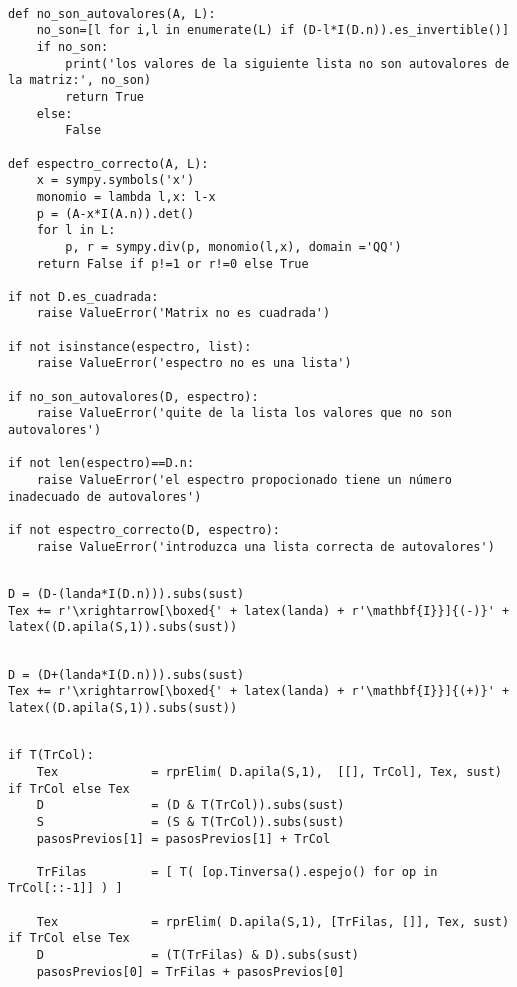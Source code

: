 \documentclass[11pt]{report}
\begin{document}
\begin{verbatim}

def no_son_autovalores(A, L):
    no_son=[l for i,l in enumerate(L) if (D-l*I(D.n)).es_invertible()]
    if no_son:
        print('los valores de la siguiente lista no son autovalores de la matriz:', no_son)
        return True
    else:
        False

def espectro_correcto(A, L):
    x = sympy.symbols('x')    
    monomio = lambda l,x: l-x
    p = (A-x*I(A.n)).det()
    for l in L:
        p, r = sympy.div(p, monomio(l,x), domain ='QQ')    
    return False if p!=1 or r!=0 else True

if not D.es_cuadrada:
    raise ValueError('Matrix no es cuadrada')

if not isinstance(espectro, list):
    raise ValueError('espectro no es una lista')

if no_son_autovalores(D, espectro):
    raise ValueError('quite de la lista los valores que no son autovalores')
    
if not len(espectro)==D.n:
    raise ValueError('el espectro propocionado tiene un número inadecuado de autovalores')

if not espectro_correcto(D, espectro):
    raise ValueError('introduzca una lista correcta de autovalores')

\end{verbatim}


\begin{verbatim}

D = (D-(landa*I(D.n))).subs(sust)
Tex += r'\xrightarrow[\boxed{' + latex(landa) + r'\mathbf{I}}]{(-)}' + latex((D.apila(S,1)).subs(sust))

\end{verbatim}

\begin{verbatim}

D = (D+(landa*I(D.n))).subs(sust)
Tex += r'\xrightarrow[\boxed{' + latex(landa) + r'\mathbf{I}}]{(+)}' + latex((D.apila(S,1)).subs(sust))

\end{verbatim}


\begin{verbatim}

if T(TrCol):
    Tex             = rprElim( D.apila(S,1),  [[], TrCol], Tex, sust) if TrCol else Tex
    D               = (D & T(TrCol)).subs(sust)
    S               = (S & T(TrCol)).subs(sust)
    pasosPrevios[1] = pasosPrevios[1] + TrCol
    
    TrFilas         = [ T( [op.Tinversa().espejo() for op in TrCol[::-1]] ) ]
    
    Tex             = rprElim( D.apila(S,1), [TrFilas, []], Tex, sust) if TrCol else Tex
    D               = (T(TrFilas) & D).subs(sust)
    pasosPrevios[0] = TrFilas + pasosPrevios[0]

\end{verbatim}
\end{document}
